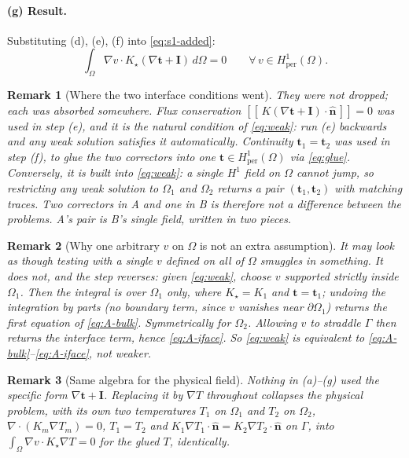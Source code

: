 \documentclass[11pt]{article}
\newtheorem{remark}{Remark}
\newcommand{\Om}{\Omega}
\newcommand{\Gam}{\Gamma}
\newcommand{\bn}{\hat{\mathbf n}}
\newcommand{\bt}{\mathbf t}
\newcommand{\bI}{\mathbf I}
\newcommand{\jump}[1]{[\![\,#1\,]\!]}
\newcommand{\Hper}{H^1_{\mathrm{per}}(\Om)}
\begin{document}
\paragraph{(g) Result.}
Substituting (d), (e), (f) into \eqref{eq:s1-added}:
\begin{equation}
\boxed{\;\int_{\Om}\nabla v\cdot K_\star(\nabla\bt+\bI)\,d\Om=0
\qquad\forall\,v\in\Hper.\;}
\label{eq:weak}
\end{equation}

\begin{remark}[Where the two interface conditions went]
They were not dropped; each was absorbed somewhere.
\emph{Flux conservation} $\jump{K(\nabla\bt+\bI)\!\cdot\!\bn}=0$ was used in
step (e), and it is the \emph{natural} condition of \eqref{eq:weak}: run (e)
backwards and any weak solution satisfies it automatically.
\emph{Continuity} $\bt_1=\bt_2$ was used in step (f), to glue the two
correctors into one $\bt\in\Hper$ via \eqref{eq:glue}. Conversely, it is
built into \eqref{eq:weak}: a single $H^1$ field on $\Om$ cannot jump, so
restricting any weak solution to $\Om_1$ and $\Om_2$ returns a pair
$(\bt_1,\bt_2)$ with matching traces. Two correctors in A and one in B is
therefore not a difference between the problems. A's pair \emph{is} B's single
field, written in two pieces.
\end{remark}

\begin{remark}[Why one arbitrary $v$ on $\Om$ is not an extra assumption]
It may look as though testing with a single $v$ defined on all of $\Om$ smuggles
in something. It does not, and the step reverses: given \eqref{eq:weak}, choose
$v$ supported strictly inside $\Om_1$. Then the integral is over $\Om_1$ only,
where $K_\star=K_1$ and $\bt=\bt_1$; undoing the integration by parts (no
boundary term, since $v$ vanishes near $\partial\Om_1$) returns the first
equation of \eqref{eq:A-bulk}. Symmetrically for $\Om_2$. Allowing $v$ to straddle $\Gam$
then returns the interface term, hence \eqref{eq:A-iface}. So \eqref{eq:weak} is
\emph{equivalent} to \eqref{eq:A-bulk}--\eqref{eq:A-iface}, not weaker.
\end{remark}

\begin{remark}[Same algebra for the physical field]
Nothing in (a)--(g) used the specific form $\nabla\bt+\bI$. Replacing it by
$\nabla T$ throughout collapses the physical problem, with its own two
temperatures $T_1$ on $\Om_1$ and $T_2$ on $\Om_2$,
$\nabla\!\cdot\!(K_m\nabla T_m)=0$, $T_1=T_2$ and
$K_1\nabla T_1\!\cdot\!\bn=K_2\nabla T_2\!\cdot\!\bn$ on $\Gam$, into
$\int_\Om\nabla v\cdot K_\star\nabla T=0$ for the glued $T$, identically.
\end{remark}
\end{document}
